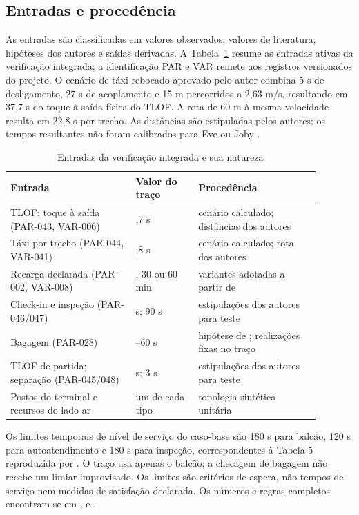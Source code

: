 \subsection{Entradas e procedência}

As entradas são classificadas em valores observados, valores de literatura, hipóteses dos autores e saídas derivadas. A Tabela~\ref{tab:entradas} resume as entradas ativas da verificação integrada; a identificação PAR e VAR remete aos registros versionados do projeto. O cenário de táxi rebocado aprovado pelo autor combina 5 s de desligamento, 27 s de acoplamento e 15 m percorridos a 2,63 m/s, resultando em 37,7 s do toque à saída física do TLOF. A rota de 60 m à mesma velocidade resulta em 22,8 s por trecho. As distâncias são estipuladas pelos autores; os tempos resultantes não foram calibrados para Eve ou Joby \citep{preisHornung2022,wille2024icas}.

\begin{table}[htbp]
\centering\small
\caption{Entradas da verificação integrada e sua natureza}
\label{tab:entradas}
\begin{tabular}{@{}>{\raggedright\arraybackslash}p{0.36\linewidth}>{\raggedright\arraybackslash}p{0.18\linewidth}>{\raggedright\arraybackslash}p{0.35\linewidth}@{}}
\toprule
Entrada & Valor do traço & Procedência \\
\midrule
TLOF: toque à saída (PAR-043, VAR-006) & 37,7 s & cenário calculado; distâncias dos autores \\
Táxi por trecho (PAR-044, VAR-041) & 22,8 s & cenário calculado; rota dos autores \\
Recarga declarada (PAR-002, VAR-008) & 0, 30 ou 60 min & variantes adotadas a partir de \citet{preis2023} \\
Check-in e inspeção (PAR-046/047) & 180 s; 90 s & estipulações dos autores para teste \\
Bagagem (PAR-028) & 30--60 s & hipótese de \citet{feldhoffSoaresRoque2021}; realizações fixas no traço \\
TLOF de partida; separação (PAR-045/048) & 50 s; 3 s & estipulações dos autores para teste \\
Postos do terminal e recursos do lado ar & um de cada tipo & topologia sintética unitária \\
\bottomrule
\end{tabular}
\end{table}

Os limites temporais de nível de serviço do caso-base são 180 s para balcão, 120 s para autoatendimento e 180 s para inspeção, correspondentes à Tabela 5 reproduzida por \citet{feldhoff2022}. O traço usa apenas o balcão; a checagem de bagagem não recebe um limiar improvisado. Os limites são critérios de espera, não tempos de serviço nem medidas de satisfação declarada. Os números e regras completos encontram-se em ,  e .

